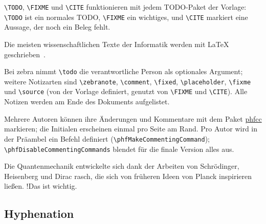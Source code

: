 \begin{ltgexample}
\end{ltgexample}

\verb|\TODO|, \verb|\FIXME| und \verb|\CITE| funktionieren mit jedem TODO-Paket der Vorlage: \verb|\TODO| ist ein normales TODO, \verb|\FIXME| ein wichtiges, und \verb|\CITE| markiert eine Aussage, der noch ein Beleg fehlt.

\begin{ltgexample}


Die meisten wissenschaftlichen Texte der Informatik werden mit \LaTeX{} geschrieben~.
\end{ltgexample}

Bei zebra nimmt \verb|\todo| die verantwortliche Person als optionales Argument; weitere Notizarten sind \verb|\zebranote|, \verb|\comment|, \verb|\fixed|, \verb|\placeholder|, \verb|\fixme| und \verb|\source| (von der Vorlage definiert, genutzt von \verb|\FIXME| und \verb|\CITE|).
Alle Notizen werden am Ende des Dokuments aufgelistet.

\begin{ltgexample}




\end{ltgexample}


Mehrere Autoren können ihre Änderungen und Kommentare mit dem Paket \href{https://ctan.org/pkg/phfcc}{phfcc} markieren; die Initialen erscheinen einmal pro Seite am Rand.
Pro Autor wird in der Präambel ein Befehl definiert (\verb|\phfMakeCommentingCommand|); \verb|\phfDisableCommentingCommands| blendet für die finale Version alles aus.

\begin{ltgexample}
Die Quantenmechanik entwickelte sich dank der Arbeiten von Schrödinger, Heisenberg und Dirac rasch,
die sich von früheren Ideen von Planck   inspirieren ließen.
 \FA!{Das ist wichtig.}
\end{ltgexample}

\subsection{Hyphenation}

